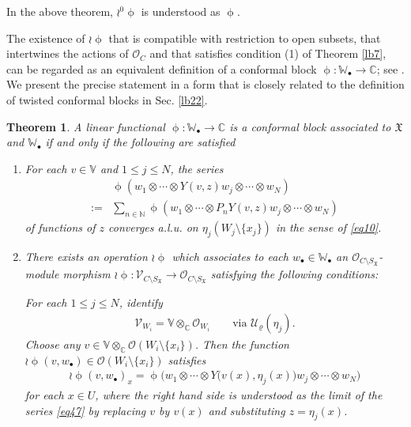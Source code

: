 \documentclass[12pt,a4paper,notitlepage]{article}
\theoremstyle{definition}
\theoremstyle{plain}
\newtheorem{thm}[df]{Theorem}
\newcommand{\fk}{\mathfrak}
\newcommand{\mc}{\mathcal}
\newcommand{\scr}{\mathscr}
\newcommand{\SX}{{S_{\fk X}}}
\newcommand{\blt}{\bullet}
\newcommand{\Vbb}{\mathbb V}
\newcommand{\Wbb}{\mathbb W}
\newcommand{\Cbb}{\mathbb C}
\newcommand{\Nbb}{\mathbb N}
\numberwithin{equation}{subsection}
\begin{document}
In the above theorem, $\wr^0\upphi$ is understood as $\upphi$.

The existence of $\wr\upphi$ that is compatible with restriction to open subsets, that intertwines the actions of $\scr O_C$ and that satisfies condition (1) of Theorem \ref{lb7}, can be regarded as an equivalent definition of a conformal block $\upphi:\Wbb_\blt\rightarrow\Cbb$; see \cite[10.1.2]{FB04}. We present the precise statement in a form that is closely related to the definition of twisted conformal blocks in Sec. \ref{lb22}.

\begin{thm}\label{lb24}
A linear functional $\upphi:\Wbb_\blt\rightarrow\Cbb$ is a conformal block associated to $\fk X$ and $\Wbb_\blt$ if and only if the following are satisfied
\begin{enumerate}
\item For each $v\in\Vbb$ and $1\leq j\leq N$, the series 
\begin{align}
&\upphi(w_1\otimes\cdots\otimes Y(v,z)w_j\otimes\cdots\otimes w_N)\nonumber\\
:=&\sum_{n\in \Nbb}\upphi(w_1\otimes\cdots\otimes P_nY(v,z)w_j\otimes\cdots\otimes w_N)\label{eq47}
\end{align}
of functions of $z$ converges a.l.u. on $\eta_j(W_j\setminus\{x_j\})$ in the sense of \eqref{eq10}.

\item There exists an operation $\wr\upphi$ which associates to each $w_\blt\in\Wbb_\blt$ an $\scr O_{C\setminus\SX}$-module morphism $\wr\upphi:\scr V_{C\setminus\SX}\rightarrow\scr O_{C\setminus\SX}$ satisfying the following conditions:




For each $1\leq j\leq N$, identify
\begin{align*}
	\scr V_{W_i}=\Vbb\otimes_\Cbb\scr O_{W_i}\qquad\text{via }\mc U_\varrho(\eta_j).	
\end{align*}
Choose any $v\in\Vbb\otimes_\Cbb\scr O(W_i\setminus\{x_i\})$. Then the function $\wr\upphi(v,w_\blt)\in\scr O(W_i\setminus\{x_i\})$ satisfies
\begin{align}
\wr\upphi(v,w_\blt)_x=\upphi\big(w_1\otimes\cdots\otimes Y\big(v(x),\eta_j(x)\big)w_j\otimes\cdots\otimes w_N\big)	\label{eq49}
\end{align}
for each $x\in U$, where the right hand side is understood as the limit of the series \eqref{eq47} by replacing $v$ by $v(x)$ and substituting $z=\eta_j(x)$.
\end{enumerate}
\end{thm}
\end{document}
